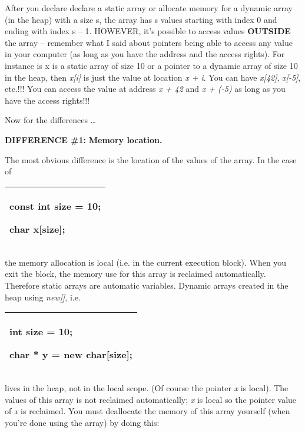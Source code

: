\documentclass[
]{article}
\begin{document}
After you declare declare a static array or allocate memory for a
dynamic array (in the heap) with a size s, the array has s values
starting with index 0 and ending with index s -- 1. HOWEVER, it's
possible to access values \textbf{OUTSIDE} the array -- remember what I
said about pointers being able to access any value in your computer (as
long as you have the address and the access rights). For instance is x
is a static array of size 10 or a pointer to a dynamic array of size 10
in the heap, then \emph{x{[}i{]}} is just the value at location \emph{x
+ i}. You can have \emph{x{[}42{]}}, \emph{x{[}-5{]}}, etc.!!! You can
access the value at address \emph{x + 42} and \emph{x + (-5)} as long as
you have the access rights!!!

Now for the differences \ldots{}

\textbf{DIFFERENCE \#1:} \textbf{Memory location.}

The most obvious difference is the location of the values of the array.
In the case of

\begin{longtable}[]{@{}l@{}}
\toprule
\endhead
\begin{minipage}[t]{0.97\columnwidth}\raggedright
const int size = 10;

char x{[}size{]};\strut
\end{minipage}\tabularnewline
\bottomrule
\end{longtable}

the memory allocation is local (i.e. in the current execution block).
When you exit the block, the memory use for this array is reclaimed
automatically. Therefore static arrays are automatic variables. Dynamic
arrays created in the heap using \emph{new{[}{]}}, i.e.

\begin{longtable}[]{@{}l@{}}
\toprule
\endhead
\begin{minipage}[t]{0.97\columnwidth}\raggedright
int size = 10;

char * y = new char{[}size{]};\strut
\end{minipage}\tabularnewline
\bottomrule
\end{longtable}

lives in the heap, not in the local scope. (Of course the pointer
\emph{x} is local). The values of this array is not reclaimed
automatically; \emph{x} is local so the pointer value of \emph{x} is
reclaimed. You must deallocate the memory of this array yourself (when
you're done using the array) by doing this:
\end{document}
